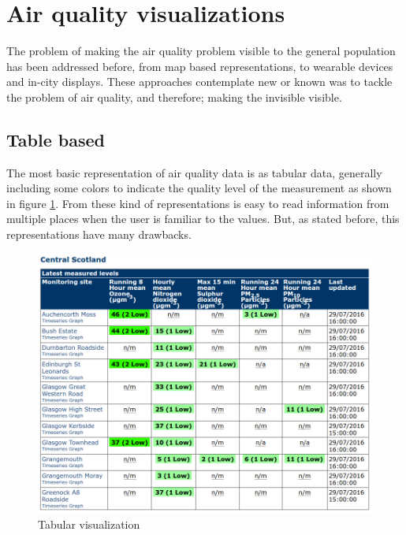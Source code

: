 \section{Air quality visualizations}
The problem of making the air quality problem visible to the general population has been addressed before, from map based representations, to wearable devices and in-city displays. These approaches contemplate new or known was to tackle the problem of air quality, and therefore; making the invisible visible.

\subsection{Table based}
The most basic representation of air quality data is as tabular data, generally including some colors to indicate the quality level of the measurement as shown in figure \ref{fig:table_based_visualization}. From these kind of representations is easy to read information from multiple places when the user is familiar to the values. But, as stated before, this representations have many drawbacks. 

\begin{figure}[H]
\begin{adjustbox}{width=1\textwidth,center=\textwidth}
  \centering
  \includegraphics[scale=1]{images/tabular_data.png}
\end{adjustbox}
  \caption[Tabular visualization]{Tabular visualization \cite{DepartmentforEnvironment}}
  \label{fig:table_based_visualization}
\end{figure}


